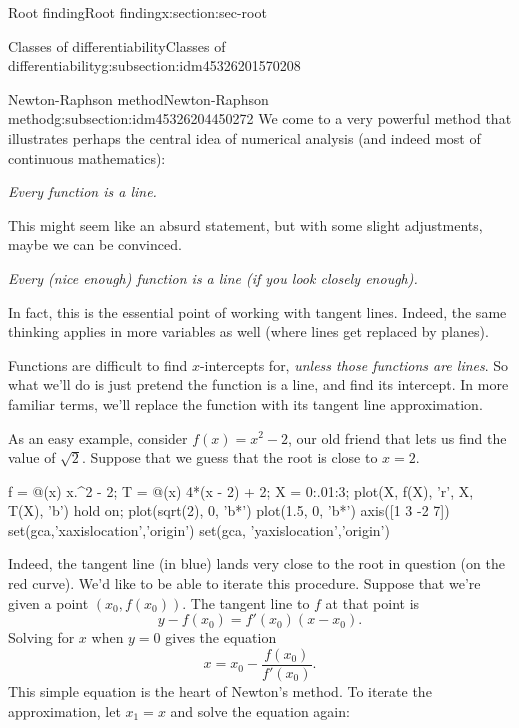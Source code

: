 \documentclass[oneside,10pt,]{article}
\numberwithin{equation}{section}
\numberwithin{equation}{section}
\begin{document}
\begin{sectionptx}{Root finding}{}{Root finding}{}{}{x:section:sec-root}
\begin{subsectionptx}{Classes of differentiability}{}{Classes of differentiability}{}{}{g:subsection:idm45326201570208}
\end{subsectionptx}
%
%
\typeout{************************************************}
\typeout{************************************************}
%
\begin{subsectionptx}{Newton-Raphson method}{}{Newton-Raphson method}{}{}{g:subsection:idm45326204450272}
We come to a very powerful method that illustrates perhaps the central idea of numerical analysis (and indeed most of continuous mathematics):%
\par
\emph{Every function is a line.}%
\par
This might seem like an absurd statement, but with some slight adjustments, maybe we can be convinced.%
\par
\emph{Every (nice enough) function is a line (if you look closely enough).}%
\par
In fact, this is the essential point of working with tangent lines. Indeed, the same thinking applies in more variables as well (where lines get replaced by planes).%
\par
Functions are difficult to find \(x\)-intercepts for, \emph{unless those functions are lines}. So what we'll do is just pretend the function is a line, and find its intercept. In more familiar terms, we'll replace the function with its tangent line approximation.%
\par
As an easy example, consider \(f(x) = x^2 - 2\), our old friend that lets us find the value of \(\sqrt{2}\). Suppose that we guess that the root is close to \(x = 2\).%
\begin{sageinput}
f = @(x) x.^2 - 2;
T = @(x) 4*(x - 2) + 2;
X = 0:.01:3;
plot(X, f(X), 'r', X, T(X), 'b')
hold on;
plot(sqrt(2), 0, 'b*')
plot(1.5, 0, 'b*')
axis([1 3 -2 7])
set(gca,'xaxislocation','origin')
set(gca, 'yaxislocation','origin')
\end{sageinput}
Indeed, the tangent line (in blue) lands very close to the root in question (on the red curve). We'd like to be able to iterate this procedure. Suppose that we're given a point \((x_0, f(x_0))\). The tangent line to \(f\) at that point is%
\begin{equation*}
y - f(x_0) = f'(x_0)(x - x_0).
\end{equation*}
Solving for \(x\) when \(y = 0\) gives the equation%
\begin{equation*}
x = x_0 - \frac{f(x_0)}{f'(x_0)}.
\end{equation*}
This simple equation is the heart of Newton's method. To iterate the approximation, let \(x_1 = x\) and solve the equation again:%

\end{subsectionptx}
\end{sectionptx}
\end{document}
